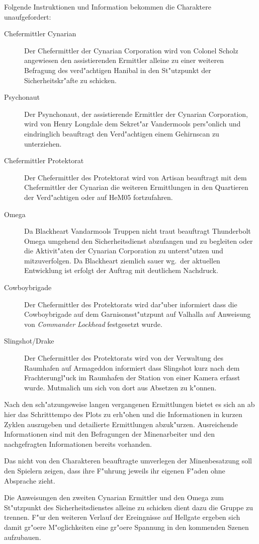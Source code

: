 Folgende Instruktionen und Information bekommen die Charaktere unaufgefordert:

\begin{description}
	\item[Chefermittler Cynarian] Der Chefermittler der Cynarian Corporation wird von Colonel Scholz angewiesen den assistierenden Ermittler alleine zu einer weiteren Befragung des verd"achtigen Hanibal in den St"utzpunkt der Sicherheitskr"afte zu schicken.
	\item[Psychonaut] Der Psynchonaut, der assistierende Ermittler der Cynarian Corporation, wird von Henry Longdale dem Sekret"ar Vandermools pers"onlich und eindringlich beauftragt den Verd"achtigen einem Gehirnscan zu unterziehen.
	\item[Chefermittler Protektorat] Der Chefermittler des Protektorat wird von Artisan beauftragt mit dem Chefermittler der Cynarian die weiteren Ermittlungen in den Quartieren der Verd"achtigen oder auf HeM05 fortzufahren.
	\item[Omega] Da Blackheart Vandarmools Truppen nicht traut beauftragt Thunderbolt  Omega umgehend den Sicherheitsdienst abzufangen und zu begleiten oder die Aktivit"aten der Cynarian Corporation zu unterst"utzen und mitzuverfolgen. Da Blackheart ziemlich sauer wg.~der aktuellen Entwicklung ist erfolgt der Auftrag mit deutlichem Nachdruck.	
	\item[Cowboybrigade] Der Chefermittler des Protektorats wird dar"uber informiert dass die Cowboybrigade auf dem Garnisonsst"utzpunt auf Valhalla auf Anweisung von \emph{Commander Lockhead} festgesetzt wurde.
	\item[Slingshot/Drake] Der Chefermittler des Protektorats wird von der Verwaltung des Raumhafen auf Armageddon informiert dass Slingshot kurz nach dem Frachterungl"uck im Raumhafen der Station von einer Kamera erfasst wurde. Mutma\3lich um sich von dort aus Absetzen zu k"onnen.
\end{description}
\vfill\pagebreak

\begin{remarks}
	Nach den sch"atzungsweise langen vergangenen Ermittlungen bietet es sich an ab hier das Schritttempo des Plots zu erh"ohen und die Informationen in kurzen Zyklen auszugeben und detailierte Ermittlungen abzuk"urzen. Ausreichende Informationen sind mit den Befragungen der Minenarbeiter und den nachgefragten Informationen bereits vorhanden.

	Das nicht von den Charakteren beauftragte umverlegen der Minenbesatzung soll den Spielern zeigen, dass ihre F"uhrung jeweils ihr eigenen F"aden ohne Absprache zieht.

	Die Anweisungen den zweiten Cynarian Ermittler und den Omega zum St"utzpunkt des Sicherheitsdienstes alleine zu schicken dient dazu die Gruppe zu trennen. F"ur den weiteren Verlauf der Ereingnisse auf Hellgate ergeben sich damit gr"o\3ere M"oglichkeiten eine gr"o\3ere Spannung in den kommenden Szenen aufzubauen.
\end{remarks}

